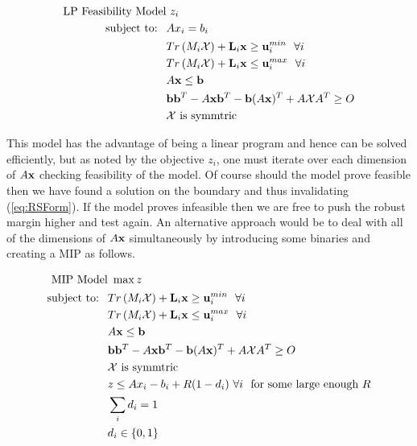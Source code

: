 \begin{subequations}\label{eq:OPTfeasrelaxLP1}
\begin{align}
 \text{LP Feasibility Model}& \ z_i  \\
 \text{subject to: } \ &Ax_i= b_i \\
 &Tr\left(M_i\mathcal{X}\right)+\bold L_i\bold x \geq \bold u_i^{min}  \ \ \forall i\\
 & Tr\left(M_i\mathcal{X}\right)+\bold L_i\bold x \leq \bold u_i^{max}  \ \ \forall i\\
 	&A\bold x\leq \bold b \\
 	&\bold b\bold b^T-A\bold x\bold b^T-\bold b(A\bold x)^T+A\mathcal{X}A^T\geq O \\
 	&\mathcal{X} \text{ is symmtric}
\end{align}
\end{subequations}

This model has the advantage of being a linear program and hence can be solved efficiently, but as noted by the objective $z_i$, one must iterate over each dimension of $A\bold x$ checking feasibility of the model. 
Of course should the model prove feasible then we have found a solution on the boundary and thus invalidating (\ref{eq:RSForm}). 
If the model proves infeasible then we are free to push the robust margin higher and test again. 
An alternative approach would be to deal with all of the dimensions of $A\bold x$ simultaneously by introducing some binaries and creating a MIP as follows. 

\begin{subequations}\label{eq:OPTfeasrelaxLP2}
\begin{align}
 \text{MIP Model}& \ \max z  \\
 \text{subject to: } \ &Tr\left(M_i\mathcal{X}\right)+\bold L_i\bold x \geq \bold u_i^{min}  \ \ \forall i\\
 & Tr\left(M_i\mathcal{X}\right)+\bold L_i\bold x \leq \bold u_i^{max}  \ \ \forall i\\
 	&A\bold x\leq \bold b \\
 	&\bold b\bold b^T-A\bold x\bold b^T-\bold b(A\bold x)^T+A\mathcal{X}A^T\geq O \\
 	&\mathcal{X} \text{ is symmtric} \\
 	& z\leq Ax_i-b_i+R(1-d_i) \ \forall i \ \text{ for some large enough $R$} \\
 	& \sum\limits_i d_i=1 \\
 	& d_i\in\{0,1\}
\end{align}
\end{subequations}

